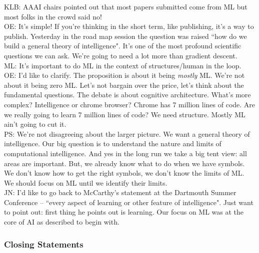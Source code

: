 KLB: AAAI chairs pointed out that most papers submitted come from ML but most folks in the crowd said no! \\

OE: It's simple! If you're thinking in the short term, like publishing, it's a way to publish. Yesterday in the road map session the question was raised ``how do we build a general theory of intelligence". It's one of the most profound scientific questions we can ask. We're going to need a lot more than gradient descent. \\

ML: It's important to do ML in the context of structures/human in the loop. \\

OE: I'd like to clarify. The proposition is about it being {\it mostly} ML. We're not about it being zero ML. Let's not bargain over the price, let's think about the fundamental questions. The debate is about cognitive architecture. What's more complex? Intelligence or chrome browser? Chrome has 7 million lines of code. Are we really going to learn 7 million lines of code? We need structure. Mostly ML ain't going to cut it. \\

PS: We're not disagreeing about the larger picture. We want a general theory of intelligence. Our big question is to understand the nature and limits of computational intelligence. And yes in the long run we take a big tent view: all areas are important. But, we already know what to do when we have symbols. We don't know how to get the right symbols, we don't know the limits of ML. We should focus on ML until we identify their limits.\\

JN: I'd like to go back to McCarthy's statement at the Dartmouth Summer Conference -- ``every aspect of learning or other feature of intelligence". Just want to point out: first thing he points out is learning. Our focus on ML was at the core of AI as described to begin with. \\

\subsubsection{Closing Statements} \\

